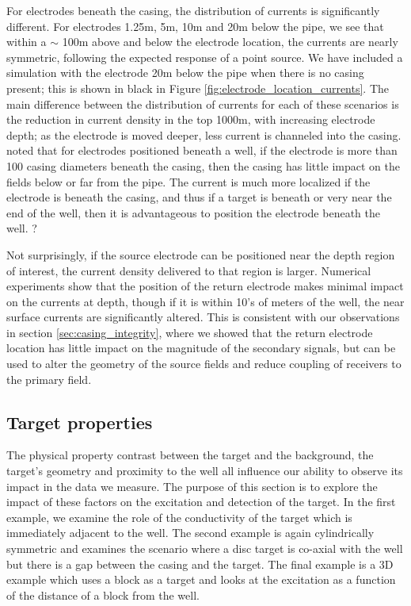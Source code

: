 For electrodes beneath the casing, the distribution of currents is significantly different. For electrodes 1.25m, 5m, 10m and 20m below the pipe, we see that within a $\sim$ 100m above and below the electrode location, the currents are nearly symmetric, following the expected response of a point source. We have included a simulation with the electrode 20m below the pipe when there is no casing present; this is shown in black in Figure \ref{fig:electrode_location_currents}. The main difference between the distribution of currents for each of these scenarios is the reduction in current density in the top 1000m, with increasing electrode depth; as the electrode is moved deeper, less current is channeled into the casing. \cite{Schenkel1990} noted that for electrodes positioned beneath a well, if the electrode is more than 100 casing diameters beneath the casing, then the casing has little impact on the fields below or far from the pipe. The current is much more localized if the electrode is beneath the casing, and thus if a target is beneath or very near the end of the well, then it is advantageous to position the electrode beneath the well.  ?

Not surprisingly, if the source electrode can be positioned near the depth region of interest, the current density delivered to that region is larger. Numerical experiments show that the position of the return electrode makes minimal impact on the currents at depth, though if it is within 10’s of meters of the well, the near surface currents are significantly altered. This is consistent with our observations in section \ref{sec:casing_integrity}, where we showed that the return electrode location has little impact on the magnitude of the secondary signals, but can be used to alter the geometry of the source fields and reduce coupling of receivers to the primary field.




\subsection{Target properties}
The physical property contrast between the target and the background, the target’s geometry and proximity to the well all influence our ability to observe its impact in the data we measure. The purpose of this section is to explore the impact of these factors on the excitation and detection of the target. In the first example, we examine the role of the conductivity of the target which is immediately adjacent to the well. The second example is again cylindrically symmetric and examines the scenario where a disc target is co-axial with the well but there is a gap between the casing and the target. The final example is a 3D example which uses a block as a target and looks at the excitation as a function of the distance of a block from the well.

